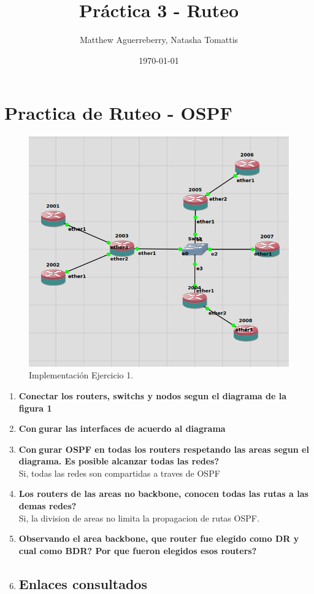 \documentclass[letterpaper,12pt]{article}
\begin{document}
\title{Práctica 3 - Ruteo}
\author{Matthew Aguerreberry, Natasha Tomattis}
\date{\today}
\maketitle



\section{Practica de Ruteo - OSPF}
\begin{figure}[ht] 
        
	\centering \includegraphics[width=0.8\columnwidth]{figure/topo_figura1.png}
	\caption{
			\label{fig:samplesetup} %
			Implementación Ejercicio 1.
	}
\end{figure}
	\begin{enumerate}
		\item \textbf{Conectar los routers, switchs y nodos segun el diagrama de la figura 1}
		\item \textbf{Congurar las interfaces de acuerdo al diagrama}
		\item \textbf{Congurar OSPF en todas los routers respetando las areas segun el diagrama. Es posible alcanzar todas las redes?}\\
		Si, todas las redes son compartidas a traves de OSPF
		\item \textbf{Los routers de las areas no backbone, conocen todas las rutas a las demas redes?}\\
		Si, la division de areas no limita la propagacion de rutas OSPF.
		\item \textbf{Observando el area backbone, que router fue elegido como DR y cual como BDR? Por que fueron elegidos esos routers?}\\
		\item 
	\subsection{Enlaces consultados}
	\end{enumerate}
\end{document}
